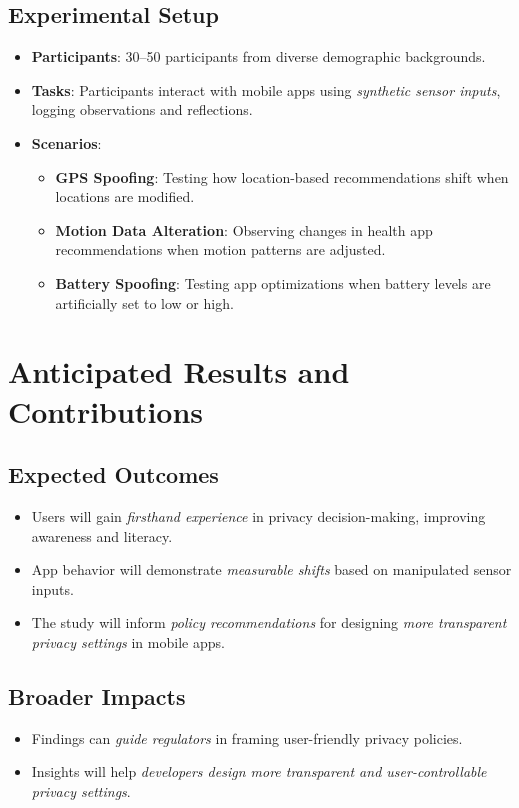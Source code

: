 \documentclass[acmlarge, nonacm]{acmart}
\begin{document}
\subsection{Experimental Setup}
\begin{itemize}
    \item \textbf{Participants}: 30--50 participants from diverse demographic backgrounds.
    \item \textbf{Tasks}: Participants interact with mobile apps using \textit{synthetic sensor inputs}, logging observations and reflections.
    \item \textbf{Scenarios}:
        \begin{itemize}
            \item \textbf{GPS Spoofing}: Testing how location-based recommendations shift when locations are modified.
            \item \textbf{Motion Data Alteration}: Observing changes in health app recommendations when motion patterns are adjusted.
            \item \textbf{Battery Spoofing}: Testing app optimizations when battery levels are artificially set to low or high.
        \end{itemize}
\end{itemize}

\section{Anticipated Results and Contributions}

\subsection{Expected Outcomes}
\begin{itemize}
    \item Users will gain \textit{firsthand experience} in privacy decision-making, improving awareness and literacy.
    \item App behavior will demonstrate \textit{measurable shifts} based on manipulated sensor inputs.
    \item The study will inform \textit{policy recommendations} for designing \textit{more transparent privacy settings} in mobile apps.
\end{itemize}

\subsection{Broader Impacts}
\begin{itemize}
    \item Findings can \textit{guide regulators} in framing user-friendly privacy policies.
    \item Insights will help \textit{developers design more transparent and user-controllable privacy settings}.
\end{itemize}




\end{document}
